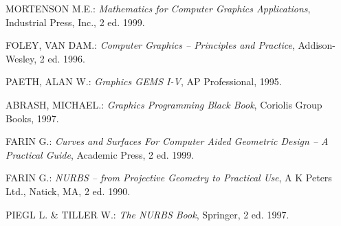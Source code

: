 \documentclass[titlepage,a4paper,11pt]{report}
\def\it{\textit}
\begin{document}
\begin{thebibliography}{0}
   MORTENSON M.E.: \textsl{Mathematics for Computer Graphics
  Applications},
  Industrial Press, Inc., 2 ed. 1999.

   FOLEY, VAN DAM.: \textsl{Computer Graphics -- Principles
   and Practice}, Addison-Wesley, 2 ed. 1996.

   PAETH, ALAN W.: \textsl{Graphics GEMS I-V},
  AP Professional, 1995.

   ABRASH, MICHAEL.: \textsl{Graphics Programming Black Book},
  Coriolis Group Books, 1997.

   FARIN G.: \it{Curves and Surfaces For Computer Aided
   Geometric Design -- A Practical Guide}, Academic Press, 2 ed. 1999.

   FARIN G.: \it{NURBS -- from Projective Geometry to
   Practical Use}, A K Peters Ltd., Natick, MA, 2 ed. 1990.

   PIEGL L. \& TILLER W.: \it{The NURBS Book}, Springer, 2 ed. 1997.
\end{thebibliography}
\end{document}
